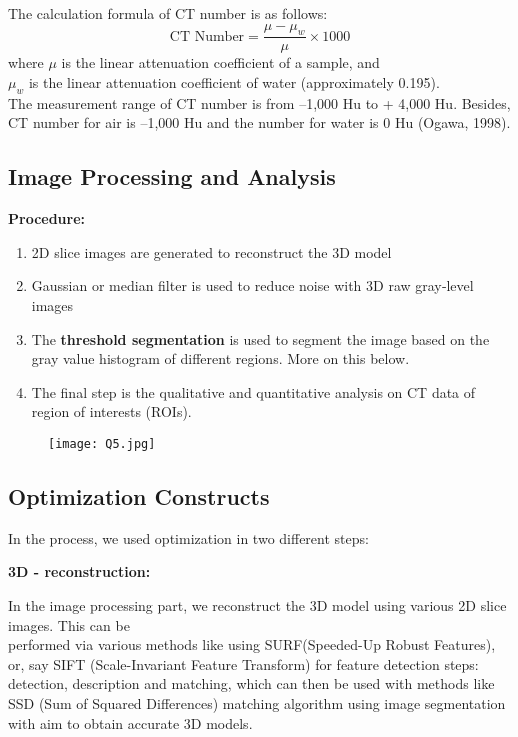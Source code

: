 \documentclass[fleqn, 11pt]{article}
\begin{document}
The calculation formula of CT number is as follows:
$$ \text{CT Number} = \frac{\mu - \mu_w}{\mu} \times 1000 $$
where $\mu$ is the linear attenuation coefficient of a sample, and\\
$\mu_w$ is the linear attenuation coefficient of water (approximately 0.195).\\
The measurement range of CT number is from –1,000 Hu to + 4,000 Hu. Besides, CT number for air is –1,000 Hu and the number for water is 0 Hu (Ogawa, 1998).

\subsection*{Image Processing and Analysis}
\textbf{Procedure:}
\begin{enumerate}[noitemsep]
    \item 2D slice images are generated to reconstruct the 3D model
    \item Gaussian or median filter is used to reduce noise with 3D raw gray‐level images
    \item The \textbf{threshold segmentation} is used to segment the image based on the gray value histogram of different regions. More on this below.
    \item The final step is the qualitative and quantitative analysis on CT data of region of interests (ROIs).
\end{enumerate}

\begin{figure}[H]
    \centering
    \texttt{[image: Q5.jpg]}
\end{figure}

\newpage 

\subsection*{Optimization Constructs}

In the process, we used optimization in two different steps: 

\medskip

\textbf{3D - reconstruction:}

\smallskip

In the image processing part, we reconstruct the 3D model using various 2D slice images. This can be \\ performed via
various methods like using SURF(Speeded-Up Robust Features), or, say SIFT (Scale-Invariant Feature Transform) 
for feature detection steps: detection, description and matching, which can then be used with methods like 
SSD (Sum of Squared Differences) matching algorithm using image segmentation with aim to obtain 
accurate 3D models. 
\end{document}
